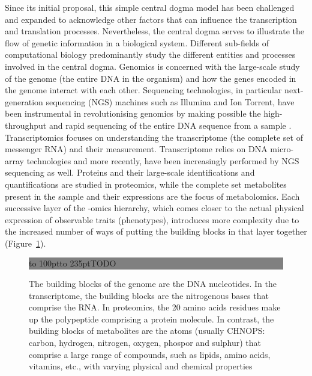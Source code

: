 Since its initial proposal, this simple central dogma model has been challenged and expanded to acknowledge other factors that can influence the transcription and translation processes. Nevertheless, the central dogma serves to illustrate the flow of genetic information in a biological system. Different sub-fields of computational biology predominantly study the different entities and processes involved in the central dogma. Genomics is concerned with the large-scale study of the genome (the entire DNA in the organism) and how the genes encoded in the genome interact with each other. Sequencing technologies, in particular next-generation sequencing (NGS) machines such as Illumina and Ion Torrent, have been instrumental in revolutionising genomics by making possible the high-throughput and rapid sequencing of the entire DNA sequence from a sample \cite{metzker2010sequencing}. Transcriptomics focuses on understanding the transcriptome (the complete set of messenger RNA) and their measurement. Transcriptome relies on DNA micro-array technologies and more recently, have been increasingly performed by NGS sequencing as well. Proteins and their large-scale identifications and quantifications are studied in proteomics, while the complete set metabolites present in the sample and their expressions are the focus of metabolomics. Each successive layer of the -omics hierarchy, which comes closer to the actual physical expression of observable traits (phenotypes), introduces more complexity due to the increased number of ways of putting the building blocks in that layer together (Figure~\ref{fig:01}).

\begin{figure}[!tph]%
\noindent \begin{centering}
\fboxsep=0pt\colorbox{gray}{\begin{minipage}[t]{235pt} \vbox to 100pt{\vfill\hbox to
235pt{\hfill\fontsize{24pt}{24pt}\selectfont TODO\hfill}\vfill}
\end{minipage}}
\par\end{centering}
\caption{The building blocks of the genome are the DNA nucleotides. In the transcriptome, the building blocks are the nitrogenous bases that comprise the RNA. In proteomics, the 20 amino acids residues make up the polypeptide comprising a protein molecule. In contrast, the building blocks of metabolites are the atoms (usually CHNOPS: carbon, hydrogen, nitrogen, oxygen, phospor and sulphur) that comprise a large range of compounds, such as lipids, amino acids, vitamins, etc., with varying physical and chemical properties}\label{fig:01}
\end{figure}

